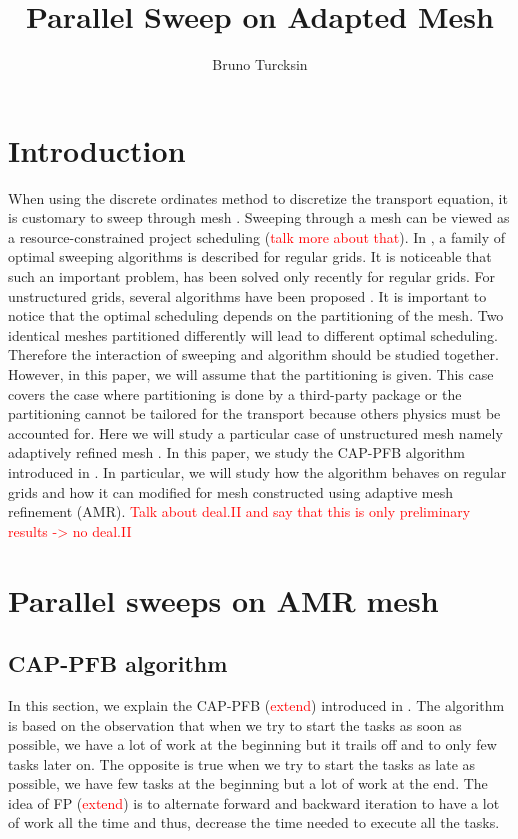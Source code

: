 \documentclass[letterpaper]{article}
\newcommand\red{\textcolor{red}}
\renewcommand{\(}{\left(}
\renewcommand{\)}{\right)}
\renewcommand{\[}{\left[}
\renewcommand{\]}{\right]}
\begin{document}
\title{Parallel Sweep on Adapted Mesh}
\author{Bruno Turcksin} 
\date{}
\maketitle

\section{Introduction}
When using the discrete ordinates method \cite{} to discretize the transport equation,
it is customary to sweep through mesh \cite{}. Sweeping through a mesh can be
viewed as a resource-constrained project scheduling \cite{} (\red{talk more
about that}). In \cite{Adams2013}, a family of optimal sweeping algorithms is
described for regular grids. It is noticeable that such an important problem,
has been solved only recently for regular grids. For unstructured grids, several
algorithms have been proposed \cite{}. It is important to notice that the
optimal scheduling depends on the partitioning of the mesh. Two identical meshes
partitioned differently will lead to different optimal scheduling. Therefore the
interaction of sweeping and algorithm should be studied together. However, in
this paper, we will assume that the partitioning is given. This case covers the
case where partitioning is done by a third-party package \cite{} or the
partitioning cannot be tailored for the transport because others physics must be
accounted for. Here we will study a particular case of unstructured mesh namely
adaptively refined mesh \cite{}. In this paper, we study the CAP-PFB algorithm
introduced in \cite{Mo2014}. In particular, we will study how the algorithm
behaves on regular grids and how it can modified for mesh constructed using
adaptive mesh refinement (AMR). \red{Talk about deal.II and say that this is
only preliminary results -> no deal.II}

\section{Parallel sweeps on AMR mesh}
\subsection{CAP-PFB algorithm}
In this section, we explain the CAP-PFB (\red{extend}) introduced in
\cite{Mo2014}. The algorithm is based on the observation that when we try to
start the tasks as soon as possible, we have a lot of work at the beginning but
it trails off and to only few tasks later on. The opposite is true when we try
to start the tasks as late as possible, we have few tasks at the beginning but a
lot of work at the end. The idea of FP (\red{extend}) is to alternate forward
and backward iteration to have a lot of work all the time and thus, decrease the
time needed to execute all the tasks.
\end{document}
